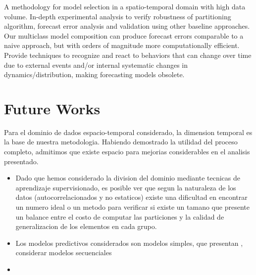 A methodology for model selection in a spatio-temporal domain with high data volume.
In-depth experimental analysis to verify robustness of partitioning algorithm, forecast error analysis and validation using other baseline approaches.
Our multiclass model composition can produce forecast errors comparable to a naive approach, but with orders of magnitude more computationally efficient. 
Provide techniques to recognize and react to behaviors that can change over time due to external events and/or internal systematic changes in dynamics/distribution, making forecasting models obsolete.


\section{Future Works}

Para el dominio de dados espacio-temporal considerado, la dimension temporal es la base de nuestra metodologia. Habiendo demostrado la utilidad del proceso completo, admitimos que existe espacio para mejorias considerables en el analisis presentado. 
\begin{itemize}
	\item Dado que hemos considerado la division del dominio mediante tecnicas de aprendizaje supervisionado, es posible ver que segun la naturaleza de los datos (autocorrelacionados y no estaticos) existe una dificultad en encontrar un numero ideal o un metodo para verificar si existe un tamano que presente un balance entre el costo de computar las particiones y la calidad de generalizacion de los elementos en cada grupo. 
	
	\item Los modelos predictivos considerados son modelos simples, que presentan , considerar modelos secuenciales 
	
	\item 
\end{itemize}